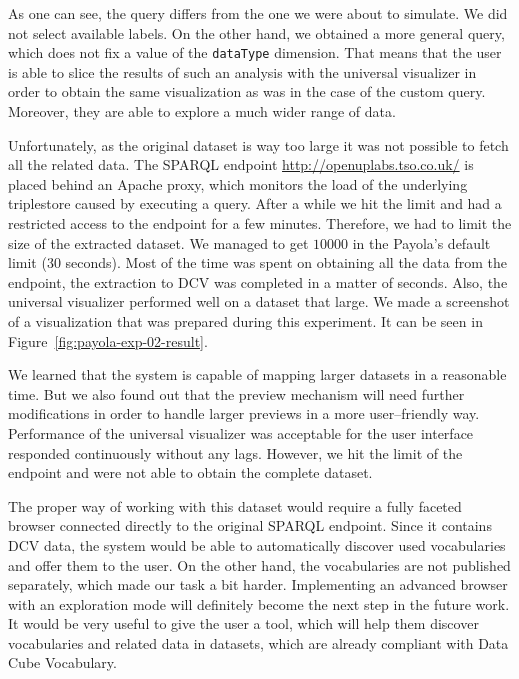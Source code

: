 As one can see, the query differs from the one we were about to simulate. We 
did not select available labels. On the other hand, we obtained a more general 
query, which does not fix a value of the \texttt{dataType} dimension. That means 
that the user is able to slice the results of such an analysis with the universal 
visualizer in order to obtain the same visualization as was in the case of the custom 
query. Moreover, they are able to explore a much wider range of data.  

\begin{sloppypar}
Unfortunately, as the original dataset is way too large it was not possible to 
fetch all the related data. The SPARQL endpoint \mbox{\url{http://openuplabs.tso.co.uk/}}
is placed behind an Apache proxy, which monitors the load of the underlying 
triplestore caused by executing a query. After a while we hit the limit and had a 
restricted access to the endpoint for a few minutes. Therefore, we had to limit 
the size of the extracted dataset. We managed to get $10000$ in the Payola's 
default limit (30 seconds). Most of the time was spent on obtaining all the 
data from the endpoint, the extraction to DCV was completed in a matter of 
seconds. Also, the universal visualizer performed well on a dataset that large.
We made a screenshot of a visualization that was prepared during this experiment.
It can be seen in Figure~\ref{fig:payola-exp-02-result}.
\end{sloppypar}

We learned that the system is capable of mapping larger datasets in a reasonable 
time. But we also found out that the preview mechanism will need further 
modifications in order to handle larger previews in a more user--friendly way. 
Performance of the universal visualizer was acceptable for the user interface 
responded continuously without any lags. However, we hit the limit of the 
endpoint and were not able to obtain the complete dataset. 

The proper way of working with this dataset would require a fully faceted 
browser connected directly to the original SPARQL endpoint. Since it contains 
DCV data, the system would be able to automatically discover used vocabularies 
and offer them to the user. On the other hand, the vocabularies are not published
separately, which made our task a bit harder. Implementing an advanced browser
with an exploration mode will definitely become the next step in the future work. It 
would be very useful to give the user a tool, which will help them 
discover vocabularies and related data in datasets, which are already compliant 
with Data Cube Vocabulary.

